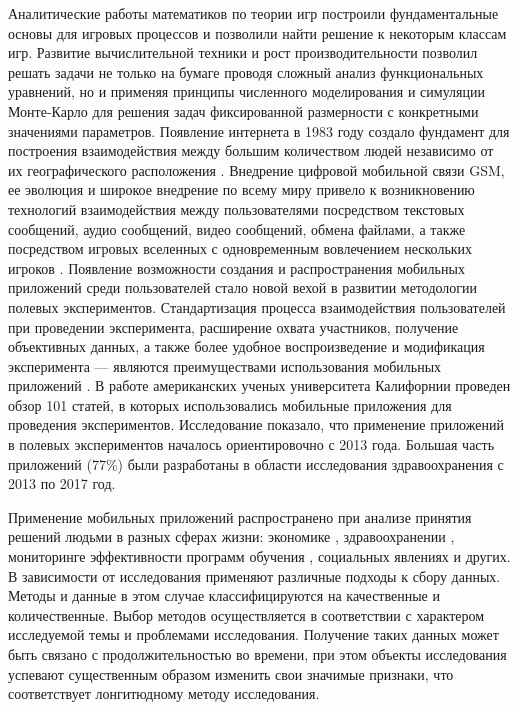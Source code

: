 Аналитические работы математиков по теории игр построили фундаментальные основы для игровых процессов и позволили найти решение к некоторым классам игр.
Развитие вычислительной техники и рост производительности позволил решать задачи не только на бумаге проводя сложный анализ функциональных уравнений,
но и применяя принципы численного моделирования и симуляции Монте-Карло \cite{} для решения задач фиксированной размерности с конкретными значениями параметров.
Появление интернета в 1983 году создало фундамент для построения взаимодействия между большим количеством людей независимо от их географического расположения \cite{}.
Внедрение цифровой мобильной связи GSM, ее эволюция и широкое внедрение по всему миру привело к возникновению технологий взаимодействия между пользователями
посредством текстовых сообщений, аудио сообщений, видео сообщений, обмена файлами, а также посредством игровых вселенных с одновременным вовлечением 
нескольких игроков \cite{}. Появление возможности создания и распространения мобильных приложений среди пользователей стало новой вехой в развитии методологии
полевых экспериментов. Стандартизация процесса взаимодействия пользователей при проведении эксперимента, расширение охвата участников, получение 
объективных данных, а также более удобное воспроизведение и модификация эксперимента --- являются преимуществами использования мобильных приложений \cite{https://doi.org/10.1177/2050157917725550}.
В работе американских ученых университета Калифорнии проведен обзор 101 статей, в которых использовались мобильные приложения для проведения экспериментов.
Исследование показало, что применение приложений в полевых экспериментов началось ориентировочно с 2013 года. Большая часть приложений (77\%) были разработаны
в области исследования здравоохранения с 2013 по 2017 год. \cite{https://doi.org/10.1177/2050157917725550}

Применение мобильных приложений распространено при анализе принятия решений людьми в разных сферах жизни: 
экономике \cite{https://journals.plos.org/plosone/article?id=10.1371/journal.pone.0250668},
здравоохранении \cite{https://doi.org/10.1016/j.pmedr.2015.08.005, https://doi.org/10.1371/journal.pcbi.1003523},
мониторинге эффективности программ обучения \cite{https://doi.org/10.1007/978-981-15-7234-0_38},
социальных явлениях \cite{https://doi.org/10.1016/j.apgeog.2017.06.010} и других.
В зависимости от исследования применяют различные подходы к сбору данных. Методы и данные в этом случае 
классифицируются на качественные и количественные.
Выбор методов осуществляется в соответствии с характером исследуемой темы и проблемами исследования.
Получение таких данных может быть связано с продолжительностью во времени, при этом объекты исследования 
успевают существенным образом изменить свои значимые признаки, что соответствует лонгитюдному методу исследования. 

